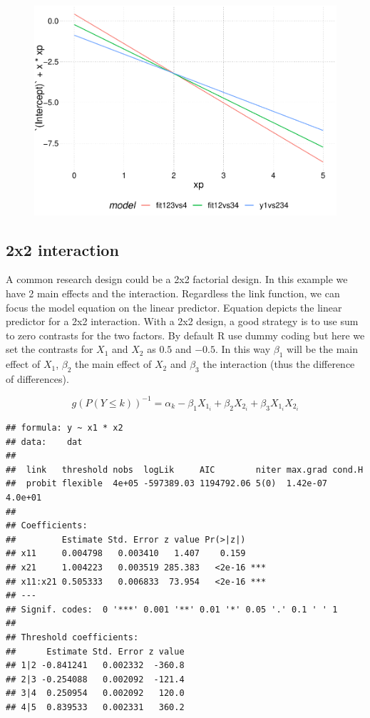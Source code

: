\documentclass[
  man,floatsintext]{apa6}
\begin{document}
\begin{figure}

{\centering \includegraphics{paper-new_files/figure-latex/unnamed-chunk-20-1} 

}

\caption{ }\label{fig:unnamed-chunk-20}
\end{figure}

\normalsize

\subsection{2x2 interaction}\label{x2-interaction}

A common research design could be a 2x2 factorial design. In this example we have 2 main effects and the interaction. Regardless the link function, we can focus the model equation on the linear predictor. Equation depicts the linear predictor for a 2x2 interaction. With a 2x2 design, a good strategy is to use sum to zero contrasts for the two factors. By default R use dummy coding but here we set the contrasts for \(X_1\) and \(X_2\) as \(0.5\) and \(-0.5\). In this way \(\beta_1\) will be the main effect of \(X_1\), \(\beta_2\) the main effect of \(X_2\) and \(\beta_3\) the interaction (thus the difference of differences).

\[
g(P(Y \leq k))^{-1} = \alpha_k - \beta_1X_{1_i} + \beta_2X_{2_i} + \beta_3X_{1_i}X_{2_i}
\]

\scriptsize

\begin{verbatim}
## formula: y ~ x1 * x2
## data:    dat
## 
##  link   threshold nobs  logLik     AIC        niter max.grad cond.H 
##  probit flexible  4e+05 -597389.03 1194792.06 5(0)  1.42e-07 4.0e+01
## 
## Coefficients:
##         Estimate Std. Error z value Pr(>|z|)    
## x11     0.004798   0.003410   1.407    0.159    
## x21     1.004223   0.003519 285.383   <2e-16 ***
## x11:x21 0.505333   0.006833  73.954   <2e-16 ***
## ---
## Signif. codes:  0 '***' 0.001 '**' 0.01 '*' 0.05 '.' 0.1 ' ' 1
## 
## Threshold coefficients:
##      Estimate Std. Error z value
## 1|2 -0.841241   0.002332  -360.8
## 2|3 -0.254088   0.002092  -121.4
## 3|4  0.250954   0.002092   120.0
## 4|5  0.839533   0.002331   360.2
\end{verbatim}
\end{document}
